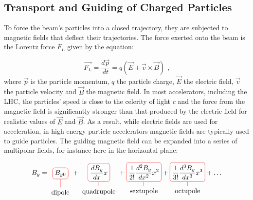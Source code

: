 \subsection{Transport and Guiding of Charged Particles}
\label{subsection:transport_and_guiding_of_charged_particles}

To force the beam's particles into a closed trajectory, they are subjected to magnetic fields that deflect their trajectories.
The force exerted onto the beam is the Lorentz force \(F_{L}\) given by the equation:

\begin{equation}
    \vec{F_L} = \dfrac{d\vec{p}}{dt} = q (\vec{E} + \vec{v} \times \vec{B}) \text{ ,}
    \label{equation:lorentz_force}
\end{equation}
where \(\vec{p}\) is the particle momentum, \(q\) the particle charge, \(\vec{E}\) the electric field, \(\vec{v}\) the particle velocity and \(\vec{B}\) the magnetic field.
In most accelerators, including the LHC, the particles' speed is close to the celerity of light \(c\) and the force from the magnetic field is significantly stronger than that produced by the electric field for realistic values of \(\vec{E}\) and \(\vec{B}\).
As a result, while electric fields are used for acceleration, in high energy particle accelerators magnetic fields are typically used to guide particles.
The guiding magnetic field can be expanded into a series of multipolar fields, for instance here in the horizontal plane:

\begin{align}
    B_{y} = 
    \tikz[baseline]{
        \node[draw=red,rounded corners,anchor=base] (m1)
        {\(\displaystyle B_{y0}\)};
        \node[below of=m1] (l1) {dipole};
        \draw[-,red] (l1) -- (m1);
    }
    +
    \tikz[baseline]{
        \node[draw=red,rounded corners,anchor=base] (m2)
        {\(\displaystyle \frac{dB_{y}}{dx} x\)};
        \node[below of=m2] (l2) {quadrupole};
        \draw[-,red] (l2) -- (m2);
    }
    +
    \tikz[baseline]{
        \node[draw=red,rounded corners,anchor=base] (m3)
        {\(\displaystyle \frac{1}{2!} \frac{d^2B_{y}}{dx^2} x^2\)};
        \node[below of=m3] (l2) {sextupole};
        \draw[-,red] (l2) -- (m3);
    }
    +
    \tikz[baseline]{
        \node[draw=red,rounded corners,anchor=base] (m4)
        {\(\displaystyle \frac{1}{3!} \frac{d^3B_{y}}{dx^3} x^3\)};
        \node[below of=m4] (l2) {octupole};
        \draw[-,red] (l2) -- (m4);
    }
    + \ldots
    \label{equation:magnetic_field_expansion}
\end{align}

